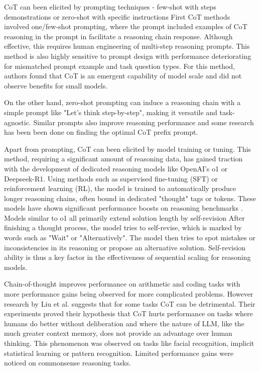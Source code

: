 CoT can been elicited by prompting techniques - few-shot with steps demonstrations or 
zero-shot with specific instructions\cite{wang2024chainofthoughtreasoningprompting}
First CoT methods\cite{wei2023chainofthoughtpromptingelicitsreasoning} involved one/few-shot prompting, 
where the prompt included examples of CoT reasoning in the prompt in facilitate a reasoning chain response.
Although effective, this requires human engineering of multi-step reasoning prompts.
This method is also highly sensitive to prompt design with performance deteriorating 
for mismatched prompt example and task question types\cite{NEURIPS2022_8bb0d291}.
For this method, authors found that CoT is an emergent capability of model scale 
and did not observe benefits for small models\cite{wei2023chainofthoughtpromptingelicitsreasoning}.

On the other hand, zero-shot prompting can induce a reasoning chain with a simple prompt like "Let's think step-by-step",
making it versatile and task-agnostic\cite{NEURIPS2022_8bb0d291}. Similar prompts also improve reasoning performance and 
some research has been been done on finding the optimal CoT prefix prompt.

Apart from prompting, CoT can been elicited by model training or tuning. 
This method, requiring a significant amount of reasoning data\cite{wang2024chainofthoughtreasoningprompting},
has gained traction with the development of dedicated reasoning models like OpenAI's o1 or Deepseek-R1.
Using methods such as supervised fine-tuning (SFT) or reinforcement learning (RL), the model is trained to
automatically produce longer reasoning chains, often bound in dedicated "thought" tags or tokens. These models have shown significant performance boosts on reasoning benchmarks .
Models similar to o1 all primarily extend solution length by self-revision\cite{zeng2025revisitingtesttimescalingo1like}
After finishing a thought process, the model tries to self-revise, which is marked by words such as "Wait" or "Alternatively". 
The model then tries to spot mistakes or inconsistencies in its reasoning or propose an alternative solution. 
Self-revision ability is thus a key factor in the effectiveness of sequential scaling for reasoning models. \cite{zeng2025revisitingtesttimescalingo1like}

Chain-of-thought improves performance on arithmetic and coding tasks with more performance gains 
being observed for more complicated problems\cite{wei2023chainofthoughtpromptingelicitsreasoning}.
However research by Liu et al.\cite{liu2024mindstepbystep} suggests that for some tasks CoT can be detrimental.
Their experiments proved their hypothesis that CoT hurts performance on tasks where humans do better without deliberation
and where the nature of LLM, like the much greater context memory, does not provide an advantage over human thinking. 
This phenomenon was observed on tasks like facial recognition, implicit statistical learning or pattern recognition.
Limited performance gains were noticed on commonsense reasoning tasks\cite{NEURIPS2022_8bb0d291}.

